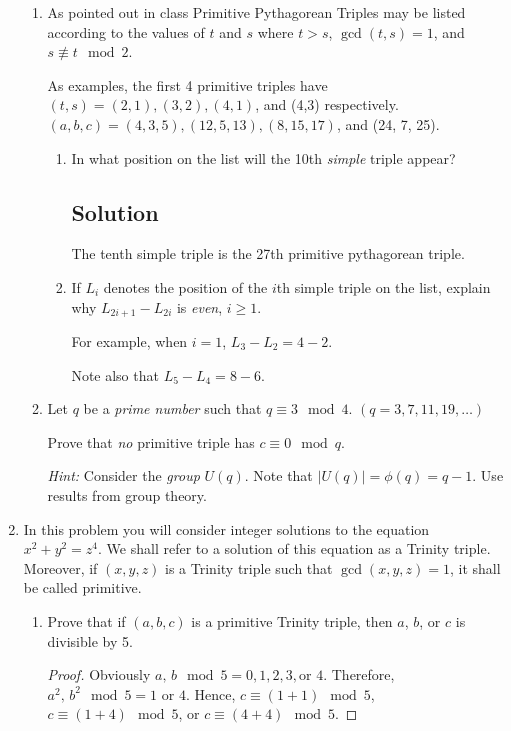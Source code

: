 \documentclass[12pt]{amsart}
\begin{document}
\begin{enumerate}
\begin{enumerate}
\item As pointed out in class Primitive Pythagorean Triples may be listed according to the values of $t$ and $s$ where $t>s$, $\gcd{(t,s)} = 1$, and $s \not\equiv t \mod 2$.

As examples, the first 4 primitive triples have $(t,s) = (2,1), (3,2), (4,1)$, and (4,3) respectively. $(a,b,c) = (4,3,5), (12,5,13), (8,15,17)$, and (24, 7, 25).
\begin{enumerate}\setlength{\itemsep}{6pt}
\item In what position on the list will the 10th {\it simple} triple appear?
\subsection*{Solution}
The tenth simple triple is the 27th primitive pythagorean triple.

\item If $L_i$ denotes the position of the $i$th simple triple on the list, explain why $L_{2i+1}-L_{2i}$ is {\it even}, $i \ge 1$.

For example, when $i=1$, $L_3-L_2 = 4-2$.

Note also that $L_5-L_4 = 8-6$.

\end{enumerate}

\item Let $q$ be a {\it prime number} such that $q\equiv 3\mod 4$. $(q = 3,7,11,19,\ldots)$

Prove that {\it no} primitive triple has $c\equiv 0 \mod q$.

{\it Hint:} Consider the {\it group} $U(q)$. Note that $|U(q)| = \phi(q) = q-1$. Use results from group theory.
\end{enumerate}

\item In this problem you will consider integer solutions to the equation $x^2+y^2=z^4$. We shall refer to a solution of this equation as a Trinity triple. Moreover, if $(x,y,z)$ is a Trinity triple such that $\gcd{(x,y,z)}=1$, it shall be called primitive.
\begin{enumerate}\setlength{\itemsep}{6pt}
\item Prove that if $(a,b,c)$ is a primitive Trinity triple, then $a$, $b$, or $c$ is divisible by 5.
\begin{proof}
Obviously $a,\,b\mod 5 = 0, 1, 2, 3, \text{or } 4$. Therefore, $a^2,\,b^2\mod 5 = 1 \text{ or } 4$. 
Hence, $c \equiv (1+1)\mod 5$, $c \equiv (1+4)\mod 5$, or $c \equiv (4+4)\mod 5$.


\end{proof}
\end{enumerate}
\end{enumerate}
\end{document}
